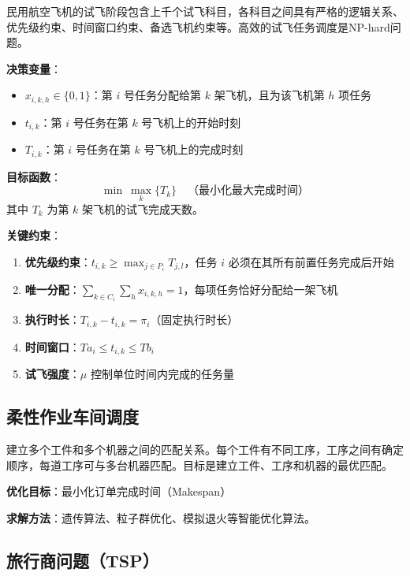\begin{conceptbox}[问题描述]
民用航空飞机的试飞阶段包含上千个试飞科目，各科目之间具有严格的逻辑关系、优先级约束、时间窗口约束、备选飞机约束等。高效的试飞任务调度是NP-hard问题。
\end{conceptbox}

\textbf{决策变量}：
\begin{itemize}
    \item $x_{i,k,h} \in \{0, 1\}$：第 $i$ 号任务分配给第 $k$ 架飞机，且为该飞机第 $h$ 项任务
    \item $t_{i,k}$：第 $i$ 号任务在第 $k$ 号飞机上的开始时刻
    \item $T_{i,k}$：第 $i$ 号任务在第 $k$ 号飞机上的完成时刻
\end{itemize}

\textbf{目标函数}：
\[
\min\ \max_{k} \{T_k\}\quad \text{（最小化最大完成时间）}
\]
其中 $T_k$ 为第 $k$ 架飞机的试飞完成天数。

\textbf{关键约束}：
\begin{enumerate}[label=(\arabic*)]
    \item \textbf{优先级约束}：$t_{i,k} \geq \max_{j \in P_i} T_{j,l}$，任务 $i$ 必须在其所有前置任务完成后开始
    \item \textbf{唯一分配}：$\sum_{k \in C_i} \sum_h x_{i,k,h} = 1$，每项任务恰好分配给一架飞机
    \item \textbf{执行时长}：$T_{i,k} - t_{i,k} = \pi_i$（固定执行时长）
    \item \textbf{时间窗口}：$Ta_i \leq t_{i,k} \leq Tb_i$
    \item \textbf{试飞强度}：$\mu$ 控制单位时间内完成的任务量
\end{enumerate}

\subsection{柔性作业车间调度}

\begin{conceptbox}[问题描述]
建立多个工件和多个机器之间的匹配关系。每个工件有不同工序，工序之间有确定顺序，每道工序可与多台机器匹配。目标是建立工件、工序和机器的最优匹配。
\end{conceptbox}

\textbf{优化目标}：最小化订单完成时间（Makespan）

\textbf{求解方法}：遗传算法、粒子群优化、模拟退火等智能优化算法。

\subsection{旅行商问题（TSP）}


